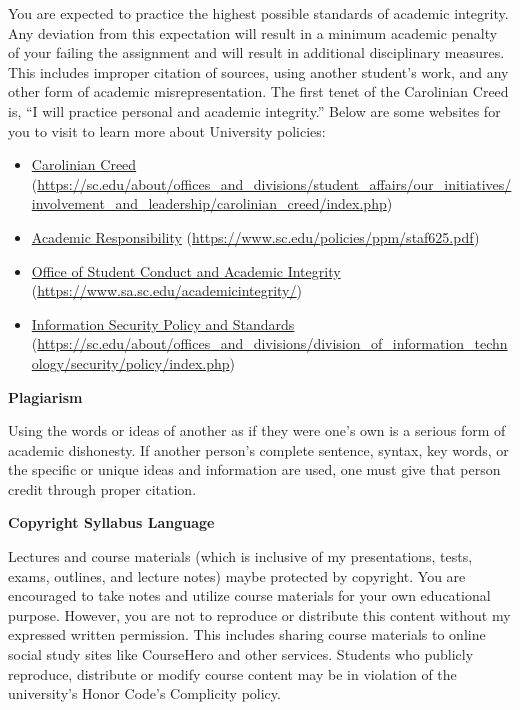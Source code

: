 \documentclass[11pt,letterpaper]{article}
\begin{document}
You are expected to practice the highest possible standards of academic integrity. Any deviation from this expectation will result in a minimum academic penalty of your failing the assignment and will result in additional disciplinary measures. This includes improper citation of sources, using another student's work, and any other form of academic misrepresentation. The first tenet of the Carolinian Creed is, ``I will practice personal and academic integrity.'' Below are some websites for you to visit to learn more about University policies:
	\begin{itemize}
	\item \href{https://sc.edu/about/offices\_and\_divisions/student\_affairs/our\_initiatives/involvement\_and\_leadership/carolinian\_creed/index.php}{Carolinian Creed} (\url{https://sc.edu/about/offices\_and\_divisions/student\_affairs/our\_initiatives/involvement\_and\_leadership/carolinian\_creed/index.php})
	\item \href{https://www.sc.edu/policies/ppm/staf625.pdf}{Academic Responsibility} (\url{https://www.sc.edu/policies/ppm/staf625.pdf})
	\item \href{https://www.sa.sc.edu/academicintegrity/}{Office of Student Conduct and Academic Integrity} (\url{https://www.sa.sc.edu/academicintegrity/})
	\item \href{https://sc.edu/about/offices\_and\_divisions/division\_of\_information\_technology/security/policy/index.php}{Information Security Policy and Standards} (\url{https://sc.edu/about/offices\_and\_divisions/division\_of\_information\_technology/security/policy/index.php})
	\end{itemize} \pvspace{0.1cm}

{\bfseries Plagiarism} \par
Using the words or ideas of another as if they were one's own is a serious form of academic dishonesty. If another person’s complete sentence, syntax, key words, or the specific or unique ideas and information are used, one must give that person credit through proper citation. \pspace

{\bfseries Copyright Syllabus Language} \par
Lectures and course materials (which is inclusive of my presentations, tests, exams, outlines, and lecture notes) maybe protected by copyright. You are encouraged to take notes and utilize course materials for your own educational purpose. However, you are not to reproduce or distribute this content without my expressed written permission. This includes sharing course materials to online social study sites like CourseHero and other services. Students who publicly reproduce, distribute or modify course content may be in violation of the university's Honor Code’s Complicity policy. \pspace
\end{document}
